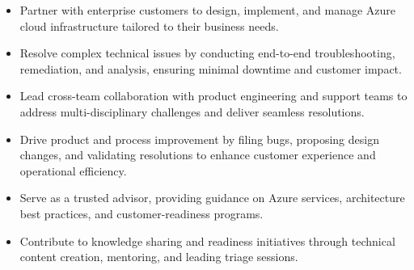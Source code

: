 \documentclass[10pt,a4paper]{altacv}
\begin{document}

\begin{fullwidth}
\makecvheader
\end{fullwidth}




\small{
\begin{itemize}
\item Partner with enterprise customers to design, implement, and manage Azure cloud infrastructure tailored to their business needs.

\item Resolve complex technical issues by conducting end-to-end troubleshooting, remediation, and analysis, ensuring minimal downtime and customer impact.

\item Lead cross-team collaboration with product engineering and support teams to address multi-disciplinary challenges and deliver seamless resolutions.

\item Drive product and process improvement by filing bugs, proposing design changes, and validating resolutions to enhance customer experience and operational efficiency.

\item Serve as a trusted advisor, providing guidance on Azure services, architecture best practices, and customer-readiness programs.

\item Contribute to knowledge sharing and readiness initiatives through technical content creation, mentoring, and leading triage sessions.

\end{itemize}
}
\end{document}
